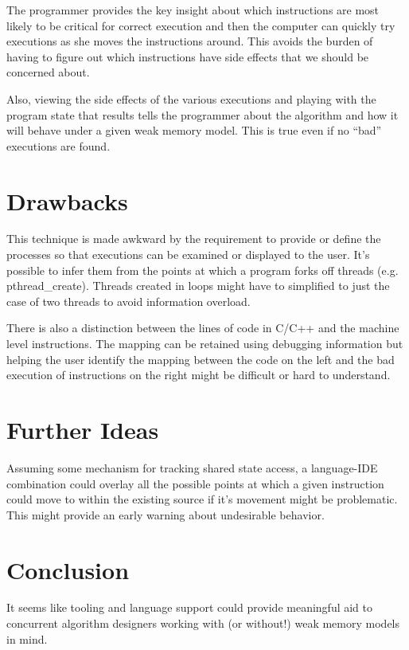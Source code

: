 \documentclass[9pt,twocolumn]{extarticle}
\newcommand{\ttf}[1]{{\ttfamily #1}}
\begin{document}
The programmer provides the key insight about which instructions are most likely to be critical for correct execution and then the computer can quickly try executions as she moves the instructions around. This avoids the burden of having to figure out which instructions have side effects that we should be concerned about.

Also, viewing the side effects of the various executions and playing with the program state that results tells the programmer about the algorithm and how it will behave under a given weak memory model. This is true even if no ``bad'' executions are found.

\vspace{-0.25cm}
\section{Drawbacks}
\vspace{-0.25cm}

This technique is made awkward by the requirement to provide or define the processes so that executions can be examined or displayed to the user. It's possible to infer them from the points at which a program forks off threads (e.g. \ttf{pthread\_create}). Threads created in loops might have to simplified to just the case of two threads to avoid information overload.

There is also a distinction between the lines of code in C/C++ and the machine level instructions. The mapping can be retained using debugging information but helping the user identify the mapping between the code on the left and the bad execution of instructions on the right might be difficult or hard to understand.

\vspace{-0.25cm}
\section{Further Ideas}
\vspace{-0.25cm}

Assuming some mechanism for tracking shared state access, a language-IDE combination could overlay all the possible points at which a given instruction could move to within the existing source if it's movement might be problematic. This might provide an early warning about undesirable behavior.

\vspace{-0.25cm}
\section{Conclusion}
\vspace{-0.25cm}

It seems like tooling and language support could provide meaningful aid to concurrent algorithm designers working with (or without!) weak memory models in mind.
\end{document}
